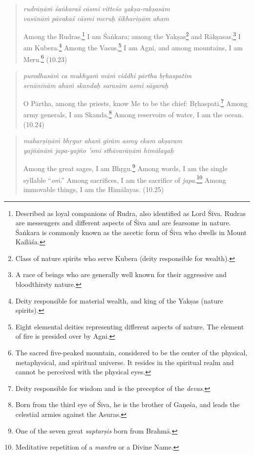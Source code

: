 \documentclass[12pt, twoside, openright]{memoir}
\begin{document}
\par
\begin{verse}
\textit{rudrāṇāṁ śaṅkaraś cāsmi vitteśo yakṣa-rakṣasām} \\
\textit{vasūnāṁ pāvakaś cāsmi meruḥ śikhariṇām aham}

\noindent Among the Rudras,\footnote{Described as loyal companions of Rudra, also identified as Lord Śiva. Rudras are messengers and different aspects of Śiva and are fearsome in nature. Śaṅkara is commonly known as the ascetic form of Śiva who dwells in Mount Kailāśa.} I am Śaṅkara; among the Yakṣas\footnote{Class of nature spirits who serve Kubera (deity responsible for wealth).} and Rākṣasas,\footnote{A race of beings who are generally well known for their aggressive and bloodthirsty nature.} I am Kubera.\footnote{Deity responsible for material wealth, and king of the Yakṣas (nature spirits).} Among the Vasus,\footnote{Eight elemental deities representing different aspects of nature. The element of fire is presided over by Agni.} I am Agni, and among mountains, I am Meru.\footnote{The sacred five-peaked mountain, considered to be the center of the physical, metaphysical, and spiritual universe. It resides in the spiritual realm and cannot be perceived with the physical eyes.} (10.23)
\end{verse}
\par



\par
\begin{verse}
\textit{purodhasāṁ ca mukhyaṁ māṁ viddhi pārtha bṛhaspatim} \\
\textit{senānīnām ahaṁ skandaḥ sarasām asmi sāgaraḥ}

\noindent O Pārtha, among the priests, know Me to be the chief: Bṛhaspati.\footnote{Deity responsible for wisdom and is the preceptor of the \textit{devas}.} Among army generals, I am Skanda.\footnote{Born from the third eye of Śiva, he is the brother of Gaṇeśa, and leads the celestial armies against the Asuras.} Among reservoirs of water, I am the ocean. (10.24)
\end{verse}
\par



\par
\begin{verse}
\textit{maharṣīṇāṁ bhṛgur ahaṁ girām asmy ekam akṣaram} \\
\textit{yajñānāṁ japa-yajño ’smi sthāvarāṇāṁ himālayaḥ}

\noindent Among the great sages, I am Bhṛgu.\footnote{One of the seven great \textit{saptarṣis} born from Brahmā.} Among words, I am the single syllable \enquote{\textit{oṁ}.} Among sacrifices, I am the sacrifice of \textit{japa}.\footnote{Meditative repetition of a \textit{mantra} or a Divine Name.} Among immovable things, I am the Himālayas. (10.25)
\end{verse}
\par
\end{document}
